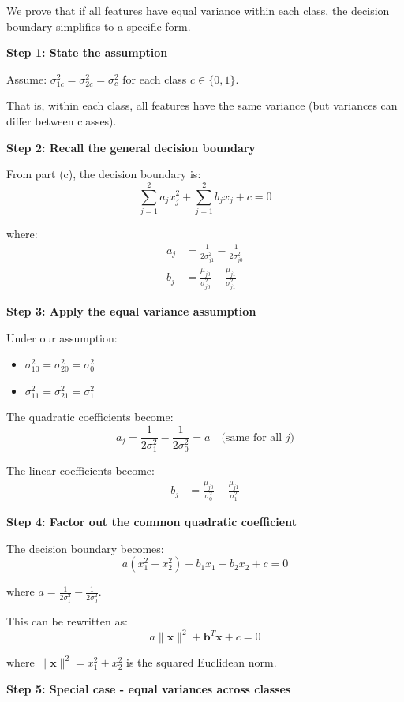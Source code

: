 \documentclass[12pt]{article}
\begin{document}
\begin{solution}
We prove that if all features have equal variance within each class, the decision boundary simplifies to a specific form.

\textbf{Step 1: State the assumption}

Assume: $\sigma_{1c}^2 = \sigma_{2c}^2 = \sigma_c^2$ for each class $c \in \{0, 1\}$.

That is, within each class, all features have the same variance (but variances can differ between classes).

\textbf{Step 2: Recall the general decision boundary}

From part (c), the decision boundary is:
\[
\sum_{j=1}^{2} a_j x_j^2 + \sum_{j=1}^{2} b_j x_j + c = 0
\]

where:
\begin{align}
a_j &= \frac{1}{2\sigma_{j1}^2} - \frac{1}{2\sigma_{j0}^2} \\
b_j &= \frac{\mu_{j0}}{\sigma_{j0}^2} - \frac{\mu_{j1}}{\sigma_{j1}^2}
\end{align}

\textbf{Step 3: Apply the equal variance assumption}

Under our assumption:
\begin{itemize}
    \item $\sigma_{10}^2 = \sigma_{20}^2 = \sigma_0^2$
    \item $\sigma_{11}^2 = \sigma_{21}^2 = \sigma_1^2$
\end{itemize}

The quadratic coefficients become:
\[
a_j = \frac{1}{2\sigma_1^2} - \frac{1}{2\sigma_0^2} = a \quad \text{(same for all } j\text{)}
\]

The linear coefficients become:
\begin{align}
b_j &= \frac{\mu_{j0}}{\sigma_0^2} - \frac{\mu_{j1}}{\sigma_1^2}
\end{align}

\textbf{Step 4: Factor out the common quadratic coefficient}

The decision boundary becomes:
\[
a(x_1^2 + x_2^2) + b_1 x_1 + b_2 x_2 + c = 0
\]

where $a = \frac{1}{2\sigma_1^2} - \frac{1}{2\sigma_0^2}$.

This can be rewritten as:
\[
a\|\mathbf{x}\|^2 + \mathbf{b}^T\mathbf{x} + c = 0
\]

where $\|\mathbf{x}\|^2 = x_1^2 + x_2^2$ is the squared Euclidean norm.

\textbf{Step 5: Special case - equal variances across classes}


\end{solution}
\end{document}
